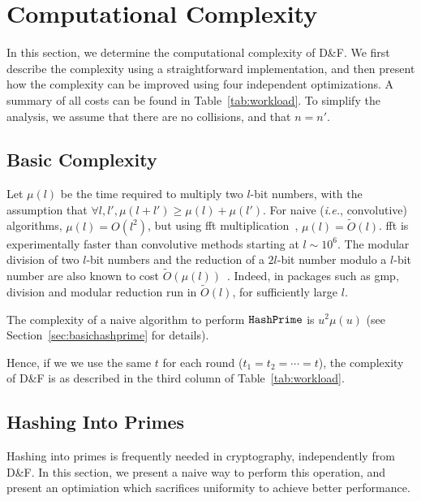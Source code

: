 \documentclass{llncs}
\newcommand{\Oapp}{\ensuremath{\tilde{O}}}
\newcommand{\df}{D\&F\xspace}
\newcommand{\ie}{\textit{i.e.}\xspace}
\begin{document}
\section{Computational Complexity}
\label{sec:comp}
In this section, we determine the computational complexity of \df. We first describe the complexity using a straightforward implementation, and then present how the complexity can be improved using four independent optimizations. A summary of all costs can be found in Table~\ref{tab:workload}.
To simplify the analysis, we assume that there are no collisions, and that $n=n'$.


\subsection{Basic Complexity}
\label{sec:basiccomp}

Let $\mu(l)$ be the time required to multiply two $l$-bit numbers, with the assumption that $\forall l,l', \mu(l+l') \ge \mu(l) + \mu(l')$.
For naive (\ie, convolutive) algorithms, $\mu(l) = O(l^2)$, but using {\sc fft} multiplication~\cite{schonhage1971schnelle}, $\mu(l) = \Oapp(l)$. {\sc fft} is experimentally faster than convolutive methods starting at $l \sim 10^6$.
The modular division of two $l$-bit numbers and the reduction of a $2l$-bit number modulo a $l$-bit number are also known to cost $\Oapp(\mu(l))$~\cite{burnikel1998fast}.
Indeed, in packages such as {\sf gmp}, division and modular reduction run in $\Oapp(l)$, for sufficiently large $l$.

The complexity of a naive algorithm to perform $\tt HashPrime$ is
$u^2 \mu(u)$ (see Section~\ref{sec:basichashprime} for details).

Hence, if we we use the same $t$ for each round ($t_1=t_2=\cdots=t$), the complexity of \df is as described in the third column of Table~\ref{tab:workload}.

\subsection{Hashing Into Primes}
\label{sec:hashprime}

Hashing into primes is frequently needed in cryptography, independently from \df. In this section, we present a naive way to perform this operation, and present an optimiation which sacrifices uniformity to achieve better performance.
\end{document}
